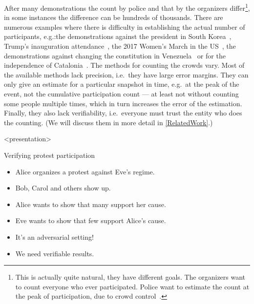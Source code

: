 After many demonstrations the count by police and that by the organizers 
differ\footnote{%
  This is actually quite natural, they have different goals.
  The organizers want to count everyone who ever participated.
  Police want to estimate the count at the peak of participation, due to crowd 
  control~\cite{2016DemonstrationsInSeoul}.
}, in some instances the difference can be hundreds of thousands.
There are numerous examples where there is difficulty in establishing the actual 
number of participants, e.g.:\@ the demonstrations against the president in 
South Korea~\cite{2016DemonstrationsInSeoul}, Trump's inauguration 
attendance~\cite{HowWillWeKnowTrumpInauguralCrowdSize}, the 2017 Women's March 
in the US~\cite{2017WomensMarchesInUS}, the demonstrations against changing the 
constitution in Venezuela~\cite{AlJazeeraOnVenezuela2017} or for the 
independence of Catalonia~\cite{CataloniaDemonstrations}.
The methods for counting the crowds vary.
Most of the available methods lack precision, i.e.\ they have large error 
margins.
They can only give an estimate for a particular snapshot in time, e.g.\ at the 
peak of the event, not the cumulative participation count --- at least not 
without counting some people multiple times, which in turn increases the error 
of the estimation.
Finally, they also lack verifiability, i.e.\ everyone must trust the entity who
does the counting.
(We will discuss them in more detail in \cref{RelatedWork}.)

\begin{frame}<presentation>
  \begin{block}{Verifying protest participation}
    \begin{itemize}
      \item Alice organizes a protest against Eve's regime.
      \item Bob, Carol and others show up.

        \pause{}

      \item {\color{green} Alice wants to show that many support her cause.}

        \pause{}

      \item {\color{red} Eve wants to show that few support Alice's cause.}
      \item It's an adversarial setting!
      \item We need verifiable results.
    \end{itemize}
  \end{block}
\end{frame}

